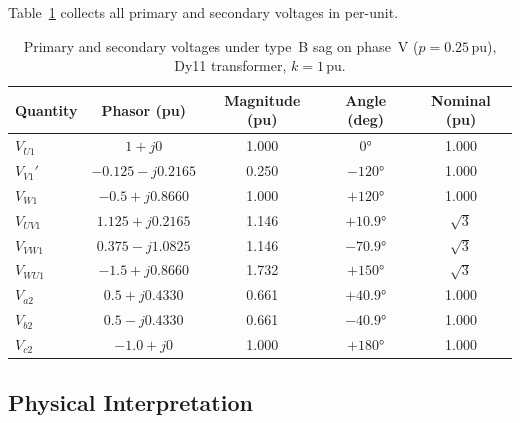 \documentclass[a4paper,11pt]{article}
\begin{document}
Table~\ref{tab:results} collects all primary and secondary voltages in per-unit.

\begin{table}[h!]
\centering
\caption{Primary and secondary voltages under type~B sag on phase~V
         ($p = 0.25\,\mathrm{pu}$), Dy11 transformer, $k{=}1\,\mathrm{pu}$.}
\label{tab:results}
\begin{tabular}{lcccc}
\toprule
\textbf{Quantity} & \textbf{Phasor (pu)} & \textbf{Magnitude (pu)}
                  & \textbf{Angle (deg)} & \textbf{Nominal (pu)}\\
\midrule
$V_{U1}$  & $1{+}j0$               & 1.000 & $0°$    & 1.000 \\
$V_{V1}'$ & $-0.125{-}j0.2165$     & 0.250 & $-120°$ & 1.000 \\
$V_{W1}$  & $-0.5{+}j0.8660$       & 1.000 & $+120°$ & 1.000 \\
\midrule
$V_{UV1}$ & $1.125{+}j0.2165$      & 1.146 & $+10.9°$  & $\sqrt{3}$\\
$V_{VW1}$ & $0.375{-}j1.0825$      & 1.146 & $-70.9°$  & $\sqrt{3}$\\
$V_{WU1}$ & $-1.5{+}j0.8660$       & 1.732 & $+150°$   & $\sqrt{3}$\\
\midrule
$V_{a2}$  & $0.5{+}j0.4330$        & 0.661 & $+40.9°$  & 1.000 \\
$V_{b2}$  & $0.5{-}j0.4330$        & 0.661 & $-40.9°$  & 1.000 \\
$V_{c2}$  & $-1.0{+}j0$            & 1.000 & $+180°$   & 1.000 \\
\bottomrule
\end{tabular}
\end{table}

\subsection{Physical Interpretation}
\end{document}
